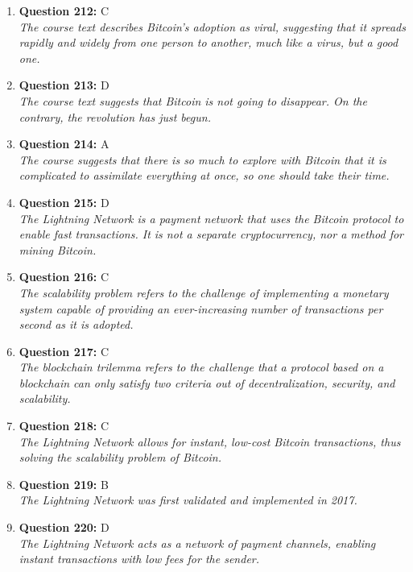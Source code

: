 \documentclass[12pt,a4paper]{article}
\begin{document}
\begin{enumerate}
\item \textbf{Question 212:} C
\\ \textit{The course text describes Bitcoin's adoption as viral, suggesting that it spreads rapidly and widely from one person to another, much like a virus, but a good one.}

\item \textbf{Question 213:} D
\\ \textit{The course text suggests that Bitcoin is not going to disappear. On the contrary, the revolution has just begun.}

\item \textbf{Question 214:} A
\\ \textit{The course suggests that there is so much to explore with Bitcoin that it is complicated to assimilate everything at once, so one should take their time.}

\item \textbf{Question 215:} D
\\ \textit{The Lightning Network is a payment network that uses the Bitcoin protocol to enable fast transactions. It is not a separate cryptocurrency, nor a method for mining Bitcoin.}

\item \textbf{Question 216:} C
\\ \textit{The scalability problem refers to the challenge of implementing a monetary system capable of providing an ever-increasing number of transactions per second as it is adopted.}

\item \textbf{Question 217:} C
\\ \textit{The blockchain trilemma refers to the challenge that a protocol based on a blockchain can only satisfy two criteria out of decentralization, security, and scalability.}

\item \textbf{Question 218:} C
\\ \textit{The Lightning Network allows for instant, low-cost Bitcoin transactions, thus solving the scalability problem of Bitcoin.}

\item \textbf{Question 219:} B
\\ \textit{The Lightning Network was first validated and implemented in 2017.}

\item \textbf{Question 220:} D
\\ \textit{The Lightning Network acts as a network of payment channels, enabling instant transactions with low fees for the sender.}


\end{enumerate}
\end{document}
